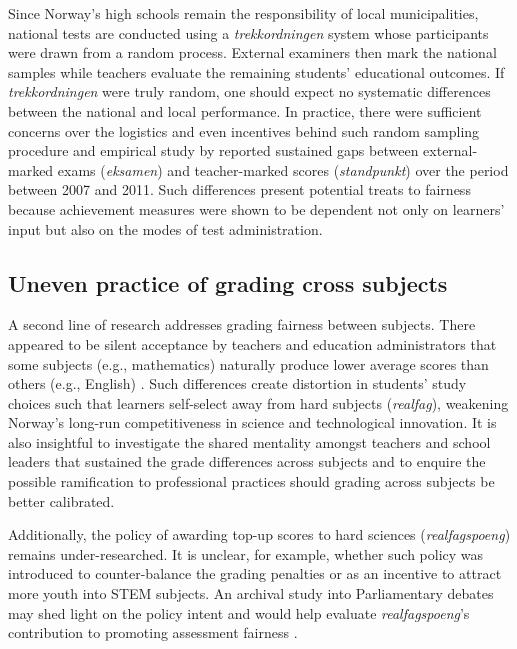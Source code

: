 \documentclass[
    a4paper,            %
    12pt,               %
    stu,                %
    donotrepeattitle,   %
    noextraspace,       %
    floatsintext,       %
    biblatex,           %
    colorlinks=true,        %
    linkcolor=red,          %
    anchorcolor=black,      %
    citecolor=blue,         %
    urlcolor=blue,          %
    bookmarks=true,         %
    bookmarksopen=false,    %
    bookmarksnumbered=true  %
]{apa7}
\begin{document}
Since Norway's high schools remain the responsibility of local municipalities, national tests are conducted using a \textit{trekkordningen} system whose participants were drawn from a random process. External examiners then mark the national samples while teachers evaluate the remaining students' educational outcomes. If \textit{trekkordningen} were truly random, one should expect no systematic differences between the national and local performance. In practice, there were sufficient concerns over the logistics and even incentives behind such random sampling procedure \parencite{olson:2021} and empirical study by \textcite{hovdhaugen:2018} reported sustained gaps between external-marked exams (\textit{eksamen}) and teacher-marked scores (\textit{standpunkt}) over the period between 2007 and 2011. Such differences present potential treats to fairness because achievement measures were shown to be dependent not only on learners' input but also on the modes of test administration.

\subsection{Uneven practice of grading cross subjects}

A second line of research addresses grading fairness between subjects. There appeared to be silent acceptance by teachers and education administrators that some subjects (e.g., mathematics) naturally produce lower average scores than others (e.g., English) \parencite{olson:2021}. Such differences create distortion in students' study choices such that learners self-select away from hard subjects (\textit{realfag}), weakening Norway's long-run competitiveness in science and technological innovation. It is also insightful to investigate the shared mentality amongst teachers and school leaders that sustained the grade differences across subjects and to enquire the possible ramification to professional practices should grading across subjects be better calibrated.

Additionally, the policy of awarding top-up scores to hard sciences (\textit{realfagspoeng}) remains under-researched. It is unclear, for example, whether such policy was introduced to counter-balance the grading penalties or as an incentive to attract more youth into STEM subjects. An archival study into Parliamentary debates may shed light on the policy intent and would help evaluate \textit{realfagspoeng}'s contribution to promoting assessment fairness \parencite{olson:2021}.
\end{document}
